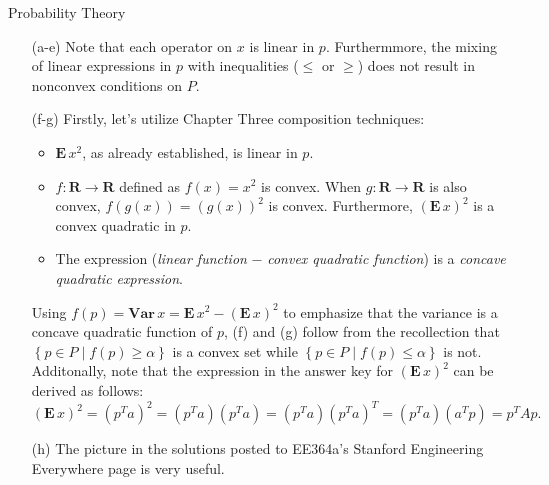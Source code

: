 \begin{chapter}{Probability Theory}
    \begin{itemize}
        \item[(a-e)] Note that each operator on $x$ is linear in $p$. Furthermmore, the
        mixing of linear expressions in $p$ with inequalities ($\le$ or $\ge$) does not result in
        nonconvex conditions on $P$.
        \item[(f-g)] Firstly, let's utilize Chapter Three composition techniques:
            \begin{itemize}
                \item $\mathbf{E}\, x^2$, as already established, is linear in $p$. %
                \item $f: \mathbf{R} \to \mathbf{R}$ defined as $f(x) = x^2$ is convex. When $g: \mathbf{R} \to \mathbf{R}$ is also convex,
                $f(g(x)) = (g(x))^2$ is convex. Furthermore, $(\mathbf{E}\, x)^2$ is a convex quadratic in $p$.
                \item The expression (\textit{linear function} $-$ \textit{convex quadratic function}) is a \textit{concave quadratic expression}.
            \end{itemize}
            Using $f(p) = \mathbf{Var}\, x = \mathbf{E}\, x^2 - (\mathbf{E}\, x)^2$ to emphasize that the variance is a concave quadratic function of $p$,
            (f) and (g) follow 
            from the recollection that $\left\{ p \in P \mid f(p) \ge \alpha \right\}$ is a convex set
            while $\left\{ p \in P \mid f(p) \le \alpha \right\}$ is not. Additonally, note that the expression in the answer key
            for $(\mathbf{E}\, x)^2$ can be derived as follows:
            \[(\mathbf{E}\, x)^2 = (p^Ta)^2 = (p^T a) (p^T a) = (p^T a) (p^T a)^T = (p^T a )(a^T p) = p^T A p.\]
        \item[(h)] The picture in the solutions posted to EE364a's Stanford Engineering Everywhere page is very useful. %
    \end{itemize}


\end{chapter}